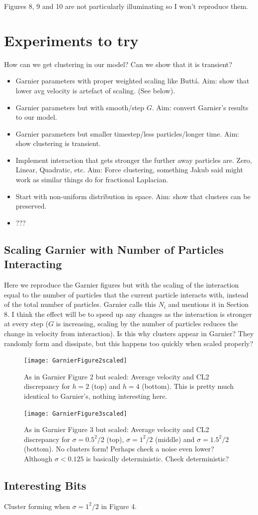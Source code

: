 \documentclass[11pt,a4paper, dvipsnames]{article}
\begin{document}
Figures 8, 9 and 10 are not particularly illuminating so I won't reproduce them.

\section{Experiments to try}
    How can we get clustering in our model? Can we show that it is transient?
\begin{itemize}
    \item Garnier parameters with proper weighted scaling like Butt\'a. Aim: show that lower avg velocity is artefact of scaling. (See below).
    \item Garnier parameters but with smooth/step $G$. Aim: convert Garnier's results to our model.
    \item Garnier parameters but smaller timestep/less particles/longer time. Aim: show clustering is transient.
    \item Implement interaction that gets stronger the further away particles are. Zero, Linear, Quadratic, etc. Aim: Force clustering, something Jakub said might work as similar things do for fractional Laplacian.
    \item Start with non-uniform distribution in space. Aim: show that clusters can be preserved.
    \item ???
\end{itemize}

\subsection{Scaling Garnier with Number of Particles Interacting }
Here we reproduce the Garnier figures but with the scaling of the interaction equal to the number of particles that the current particle interacts with, instead of the total number of particles. Garnier calls this $N_i$ and mentions it in Section 8. I think the effect will be to speed up any changes as the interaction is stronger at every step ($G$ is increasing, scaling by the number of particles reduces the change in velocity from interaction). Is this why clusters appear in Garnier? They randomly form and dissipate, but this happens too quickly when scaled properly?
\begin{figure}
    \centering
        \texttt{[image: GarnierFigure2scaled]}
    \caption{As in Garnier Figure 2 but scaled: Average velocity and CL2 discrepancy for $ h=2$ (top) and $h=4$ (bottom). This is pretty much identical to Garnier's, nothing interesting here. }
\end{figure}
\begin{figure}
    \centering
    \texttt{[image: GarnierFigure3scaled]}
    \caption{As in Garnier Figure 3 but scaled: Average velocity and CL2 discrepancy for $\sigma = 0.5^2/2$ (top), $\sigma = 1^2/2$ (middle) and $\sigma = 1.5^2/2$ (bottom). No clusters form! Perhaps check a noise even lower? Although $\sigma < 0.125$ is basically deterministic. Check deterministic?}
\end{figure}

\subsection{Interesting Bits}
Cluster forming when $\sigma =1^2/2$ in Figure 4.
\end{document}
